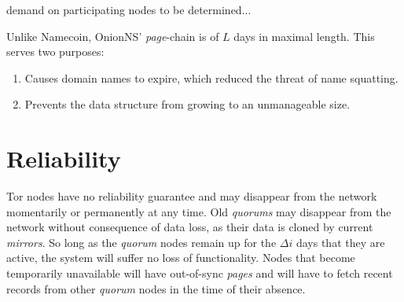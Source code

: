 demand on participating nodes to be determined...

Unlike Namecoin, OnionNS' \emph{page}-chain is of $ L $ days in maximal length. This serves two purposes:

\begin{enumerate}
	\item Causes domain names to expire, which reduced the threat of name squatting.
	\item Prevents the data structure from growing to an unmanageable size.
\end{enumerate}

\section{Reliability}


Tor nodes have no reliability guarantee and may disappear from the network momentarily or permanently at any time. Old \emph{quorums} may disappear from the network without consequence of data loss, as their data is cloned by current \emph{mirrors}. So long as the \emph{quorum} nodes remain up for the $ \Delta i $ days that they are active, the system will suffer no loss of functionality. Nodes that become temporarily unavailable will have out-of-sync \emph{pages} and will have to fetch recent records from other \emph{quorum} nodes in the time of their absence.



